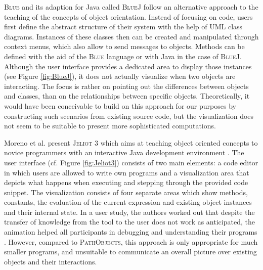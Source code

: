 \textsc{Blue} \cite{kolling_object-oriented_1996, kolling_blue_1996} and its adaption for Java called \textsc{BlueJ} \cite{kolling_bluej_2003} follow an alternative approach to the teaching of the concepts of object orientation.
Instead of focusing on code, users first define the abstract structure of their system with the help of UML class diagrams.
Instances of these classes then can be created and manipulated through  context menus, which also allow to send messages to objects.
Methods can be defined with the aid of the \textsc{Blue} language or with Java in the case of \textsc{BlueJ}.
Although the user interface provides a dedicated area to display those instances (see Figure \ref{fig:BlueJ}), it does not actually visualize when two objects are interacting.
The focus is rather on pointing out the differences  between objects and classes, than on the relationships between specific objects.
Theoretically, it would have been conceivable to build on this approach for our purposes by constructing such scenarios from existing source code, but the visualization does not seem to be suitable to present more sophisticated computations.

Moreno et al. present \textsc{Jeliot 3} which aims at teaching object oriented concepts to novice programmers with an interactive Java development environment \cite{moreno_visualizing_2004, bednarik_jeliot_2005}.
The user interface (cf. Figure \ref{fig:Jeliot3}) consists of two main elements: a code editor in which users are allowed to write own programs and a visualization area that depicts what happens when executing and stepping through the provided code snippet.
The visualization consists of four separate areas which show methods, constants, the evaluation of the current expression and existing object instances and their internal state.
In a user study, the authors worked out that despite the transfer of knowledge from the tool to the user does not work as anticipated, the animation helped all participants in debugging and understanding their programs \cite{moreno_jeliot_2007}.
However, compared to \textsc{PathObjects}, this approach is only appropriate for much smaller programs, and unsuitable to communicate an overall picture over existing objects and their interactions.